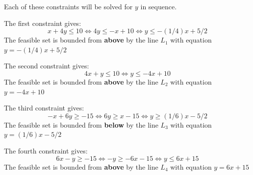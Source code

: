 \documentclass{article}
\begin{document}
Each of these constraints will be solved for \(y\) in sequence.

\vspace{5mm}

The first constraint gives:
\[x + 4y \leq 10 \iff 4y \leq -x + 10 \iff y \leq -(1/4)x + 5/2\]
The feasible set is bounded from {\bf above} by the line \(L_1\) with equation \(y = -(1/4)x + 5/2\)

\vspace{5mm}

The second constraint gives:
\[4x + y \leq 10 \iff y \leq -4x + 10\]
The feasible set is bounded from {\bf above} by the line \(L_2\) with equation \(y = -4x + 10\)

\vspace{5mm}

The third constraint gives:
\[-x + 6y \geq -15 \iff 6y \geq x - 15 \iff y \geq (1/6)x - 5/2\]
The feasible set is bounded from {\bf below} by the line \(L_3\) with equation \(y = (1/6)x - 5/2\)

\vspace{5mm}

The fourth constraint gives:
\[6x - y \geq -15 \iff -y \geq -6x - 15 \iff y \leq 6x + 15\]
The feasible set is bounded from {\bf above} by the line \(L_4\) with equation \(y = 6x + 15\)

\vspace{5mm}
\end{document}
